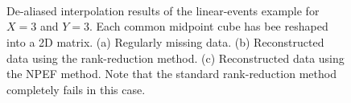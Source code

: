 {%
%



\begin{figure}[htb!]
    \centering
    \\
    \\
    \\
	\caption{De-aliased interpolation results of the linear-events example for $X=3$ and $Y=3$. Each common midpoint cube has bee reshaped into a 2D matrix. (a) Regularly missing data. (b) Reconstructed data using the rank-reduction method. (c) Reconstructed data using the NPEF method. Note that the standard rank-reduction method completely fails in this case.}
	\label{fig:la_obs5d,la_drr5d,la_npef5d}
\end{figure}

}

